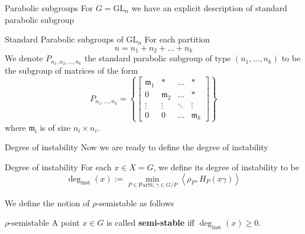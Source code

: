 \documentclass[pdf]{beamer}
\begin{document}
\begin{frame}{Parabolic subgroups}
    For $G =\text{GL}_n$ we have an explicit description of standard parabolic subgroup
    \pause\begin{block}{Standard Parabolic subgroups of $\text{GL}_n$}
        For each partition
        $$n = n_1+n_2+\ldots+n_k$$
        We denote $P_{n_1,n_2,\ldots,n_k}$ the standard parabolic subgroup of type $(n_1,\ldots, n_k)$ to be the subgroup of
        matrices of the form
        \[P_{n_1,\ldots, n_k} = \left\lbrace \begin{bmatrix}
                \mathfrak{m}_1 & \ast           & \ldots & \ast           \\
                0              & \mathfrak{m}_2 & \ldots & \ast           \\
                \vdots         & \vdots         & \ddots & \vdots         \\
                0              & 0              & \ldots & \mathfrak{m}_k
            \end{bmatrix} \right\rbrace\]
        where $\mathfrak{m_i}$ is of size $n_i \times n_i$.
    \end{block}
\end{frame}
\begin{frame}{Degree of instability}
    Now we are ready to define the degree of instability
    \begin{block}{Degree of instability}
        For each $x \in X = G$, we define its degree of instability to be
        \[\deg_{\text{inst}}(x):= \min_{P \in \text{ParSt}, \gamma \in G/P}\left\langle\rho_P, H_P(x\gamma) \right\rangle \]
    \end{block}\pause
    We define the notion of $\rho$-semistable as follows
    \begin{block}{$\rho$-semistable}
        A point $x \in G$ is called \textbf{semi-stable} iff $\deg_{\text{inst}}(x) \ge 0$.
    \end{block}
\end{frame}
\end{document}
